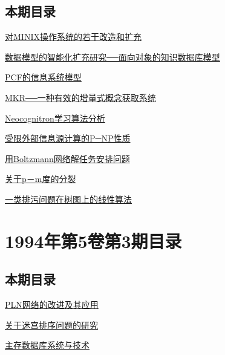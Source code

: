 \documentclass[a4paper]{article}
\begin{document}
\subsection{本期目录}
\href{http://www.jos.org.cn/ch/reader/download_pdf.aspx?file_no=19940401&year_id=1994&quarter_id=4&falg=1}{对MINIX操作系统的若干改造和扩充}

\href{http://www.jos.org.cn/ch/reader/download_pdf.aspx?file_no=19940402&year_id=1994&quarter_id=4&falg=1}{数据模型的智能化扩充研究──面向对象的知识数据库模型}

\href{http://www.jos.org.cn/ch/reader/download_pdf.aspx?file_no=19940403&year_id=1994&quarter_id=4&falg=1}{PCF的信息系统模型}

\href{http://www.jos.org.cn/ch/reader/download_pdf.aspx?file_no=19940404&year_id=1994&quarter_id=4&falg=1}{MKR──一种有效的增量式概念获取系统}

\href{http://www.jos.org.cn/ch/reader/download_pdf.aspx?file_no=19940405&year_id=1994&quarter_id=4&falg=1}{Neocognitron学习算法分析}

\href{http://www.jos.org.cn/ch/reader/download_pdf.aspx?file_no=19940406&year_id=1994&quarter_id=4&falg=1}{受限外部信息源计算的P─NP性质}

\href{http://www.jos.org.cn/ch/reader/download_pdf.aspx?file_no=19940407&year_id=1994&quarter_id=4&falg=1}{用Boltzmann网络解任务安排问题}

\href{http://www.jos.org.cn/ch/reader/download_pdf.aspx?file_no=19940408&year_id=1994&quarter_id=4&falg=1}{关于p－m度的分裂}

\href{http://www.jos.org.cn/ch/reader/download_pdf.aspx?file_no=19940409&year_id=1994&quarter_id=4&falg=1}{一类排污问题在树图上的线性算法}


\section{\textbf{1994年第5卷第3期目录}}
\subsection{本期目录}
\href{http://www.jos.org.cn/ch/reader/download_pdf.aspx?file_no=19940301&year_id=1994&quarter_id=3&falg=1}{PLN网络的改进及其应用}

\href{http://www.jos.org.cn/ch/reader/download_pdf.aspx?file_no=19940302&year_id=1994&quarter_id=3&falg=1}{关于迷宫排序问题的研究}

\href{http://www.jos.org.cn/ch/reader/download_pdf.aspx?file_no=19940303&year_id=1994&quarter_id=3&falg=1}{主存数据库系统与技术}
\end{document}
